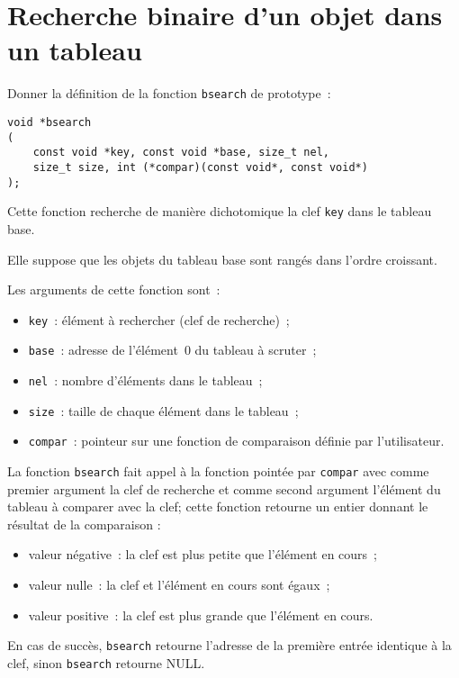 \section{Recherche binaire d'un objet dans un tableau}
Donner la d\'efinition de la fonction  \verb+bsearch+ de prototype~:
\begin{verbatim}
void *bsearch
(
    const void *key, const void *base, size_t nel,
    size_t size, int (*compar)(const void*, const void*)
);
\end{verbatim}
Cette fonction recherche de mani\`ere dichotomique la clef \verb+key+ dans le tableau base.
\par\smallskip
Elle suppose que les objets du tableau base sont rang\'es dans l'ordre croissant.
\par\smallskip
Les arguments de cette fonction sont~:
\begin{itemize}
        \item\verb+key+~: \'el\'ement {\`a} rechercher (clef de recherche)~;
          \item\verb+base+~: adresse de l'\'el\'ement~$0$ du tableau {\`a} scruter~;
          \item\verb+nel+~: nombre d'\'el\'ements dans le tableau~;
          \item\verb+size+~: taille de chaque \'el\'ement dans le tableau~;
          \item\verb+compar+~: pointeur sur une fonction de comparaison d\'efinie par l'utilisateur.
\end{itemize}
\par\medskip
La fonction \verb+bsearch+ fait appel \`a la fonction point\'ee par \verb+compar+ avec comme premier argument la clef de recherche et comme second argument l'\'el\'ement du tableau \`a comparer avec la clef; cette fonction retourne un entier donnant le r\'esultat de la comparaison :
\begin{itemize}
\item valeur n\'egative~: la clef est plus petite que l'\'el\'ement en cours~;
\item valeur nulle~: la clef et l'\'el\'ement en cours sont \'egaux~;
\item valeur positive~: la clef est plus grande que l'\'el\'ement en cours.
\end{itemize}
\par\medskip
En cas de succ\`es, \verb+bsearch+ retourne l'adresse de la premi\`ere entr\'ee identique \`a la clef, sinon \verb+bsearch+ retourne NULL.
\par\medskip
